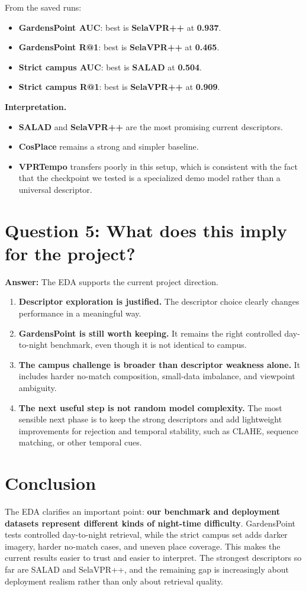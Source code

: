 \documentclass[11pt]{article}
\begin{document}
From the saved runs:
\begin{itemize}[leftmargin=*]
  \item \textbf{GardensPoint AUC}: best is \textbf{SelaVPR++} at \textbf{0.937}.
  \item \textbf{GardensPoint R@1}: best is \textbf{SelaVPR++} at \textbf{0.465}.
  \item \textbf{Strict campus AUC}: best is \textbf{SALAD} at \textbf{0.504}.
  \item \textbf{Strict campus R@1}: best is \textbf{SelaVPR++} at \textbf{0.909}.
\end{itemize}

\textbf{Interpretation.}
\begin{itemize}[leftmargin=*]
  \item \textbf{SALAD} and \textbf{SelaVPR++} are the most promising current descriptors.
  \item \textbf{CosPlace} remains a strong and simpler baseline.
  \item \textbf{VPRTempo} transfers poorly in this setup, which is consistent with the fact that the checkpoint we tested is a specialized demo model rather than a universal descriptor.
\end{itemize}

\section*{Question 5: What does this imply for the project?}
\textbf{Answer:} The EDA supports the current project direction.

\begin{enumerate}[leftmargin=*]
  \item \textbf{Descriptor exploration is justified.} The descriptor choice clearly changes performance in a meaningful way.
  \item \textbf{GardensPoint is still worth keeping.} It remains the right controlled day-to-night benchmark, even though it is not identical to campus.
  \item \textbf{The campus challenge is broader than descriptor weakness alone.} It includes harder no-match composition, small-data imbalance, and viewpoint ambiguity.
  \item \textbf{The next useful step is not random model complexity.} The most sensible next phase is to keep the strong descriptors and add lightweight improvements for rejection and temporal stability, such as CLAHE, sequence matching, or other temporal cues.
\end{enumerate}

\section*{Conclusion}
The EDA clarifies an important point: \textbf{our benchmark and deployment datasets represent different kinds of night-time difficulty}. GardensPoint tests controlled day-to-night retrieval, while the strict campus set adds darker imagery, harder no-match cases, and uneven place coverage. This makes the current results easier to trust and easier to interpret. The strongest descriptors so far are SALAD and SelaVPR++, and the remaining gap is increasingly about deployment realism rather than only about retrieval quality.
\end{document}
